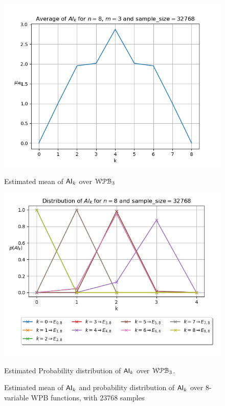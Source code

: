 \documentclass[11pt]{llncs}
\begin{document}


\begin{figure}[ht]
    \centering
    \begin{minipage}[b]{0.45\textwidth}
        \centering
        \includegraphics[width=\textwidth]{images/WPB_3_sample_size_32768_dist.png}
        \caption{Estimated mean of $\mathsf{AI}_{k}$ over $\mathcal{WPB}_{3}$}
        \label{fig:averages32768}
    \end{minipage}
    \hfill
    \begin{minipage}[b]{0.5\textwidth}
        \centering
        \includegraphics[width=\textwidth]{images/WPB_3_sample_size_32768_dist_prob.png}
        \caption{Estimated Probability distribution of $\mathsf{AI}_{k}$ over $\mathcal{WPB}_{3}$.}
        \label{fig:probDist32768}
    \end{minipage}
    \caption{Estimated mean of $\mathsf{AI}_{k}$ and probability distribution of $\mathsf{AI}_{k}$ over $8$-variable WPB functions, with $23768$ samples}
    \label{fig:main2}
\end{figure}
\end{document}
